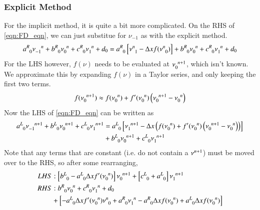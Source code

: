 \documentclass[letterpaper,12pt]{article}
\newcommand \bcf{f}
\begin{document}
\subsubsection{Explicit Method}
For the implicit method, it is quite a bit more complicated.
On the RHS of \ref{eqn:FD_eqn}, we can just substitue for $\nu_{-1}$ as with the explicit method.
\begin{equation}
  \label{eqn:lhs}
  a\indices{^R_0} \nu\indices{_{-1}^{n  }}
+ b\indices{^R_0} \nu\indices{_{ 0}^{n  }}
+ c\indices{^R_0} \nu\indices{_{ 1}^{n  }}
+ d_0
=
  a\indices{^R_0} \left[\nu\indices{^{n}_{1}} - \Delta x \bcf(\nu\indices{^{n}_{0}})\right]
+ b\indices{^R_0} \nu\indices{_{ 0}^{n  }}
+ c\indices{^R_0} \nu\indices{_{ 1}^{n  }}
+ d_0
\end{equation}
For the LHS however, $\bcf\left(\nu\right)$ needs to be evaluated at $\nu\indices{_{0}^{n+1}}$, which isn't known. We approximate this by expanding $\bcf\left(\nu\right)$ in a Taylor series, and only keeping the first two terms.
\begin{equation}
  \bcf(\nu\indices{_{0}^{n+1}}) \approx \bcf (\nu\indices{_{0}^{n}})
                                      +  \bcf'(\nu\indices{_{0}^{n}}) \left( \nu\indices{_{0}^{n+1}} - \nu\indices{_{0}^{n}} \right)
\end{equation}
Now the LHS of \ref{eqn:FD_eqn} can be written as
\begin{align}
  \label{eqn:rhs}
  a\indices{^L_0} \nu\indices{_{-1}^{n+1}}
+ b\indices{^L_0} \nu\indices{_{0 }^{n+1}}
+ c\indices{^L_0} \nu\indices{_{ 1}^{n+1}}
&=
a\indices{^L_0} \left[ \nu\indices{_{1}^{n+1}}
                    - \Delta x \left(\bcf (\nu\indices{_{0}^{n}})
                               +     \bcf'(\nu\indices{_{0}^{n}}) \left( \nu\indices{_{0}^{n+1}} - \nu\indices{_{0}^{n}} \right) \right)
               \right] \nonumber \\
&+ b\indices{^L_0} \nu\indices{_{0  }^{n+1}}
 + c\indices{^L_0} \nu\indices{_{  1}^{n+1}}
\end{align}
Note that any terms that are constant (i.e. do not contain a $\nu\indices{^{n+1}}$) must be moved over to the RHS, so after
some rearranging,
\begin{align}
  \label{eqn:minLHS}
  LHS&: 
  \left[b\indices{^L_0} - a\indices{^L_0}\Delta x \bcf'(\nu\indices{_{0}^n}) \right] \nu\indices{_0^{n+1}}
+ \left[c\indices{^L_0} + a\indices{^L_0}                                             \right] \nu\indices{_1^{n+1}} \\
  \label{eqn:minRHS}
  RHS&:
  b\indices{^R_0}\nu\indices{_0^n}
+ c\indices{^R_0}\nu\indices{_1^n}
+ d_0 \nonumber \\
&+
\left[
- a\indices{^L_0} \Delta x \bcf'(\nu\indices{_0^n}) \nu\indices{^n_0}
+ a\indices{^R_0}                 \nu\indices{_1^n} 
- a\indices{^R_0} \Delta x \bcf (\nu\indices{_0^n})
+ a\indices{^L_0} \Delta x \bcf (\nu\indices{_0^n})
\right]
\end{align}
\end{document}
